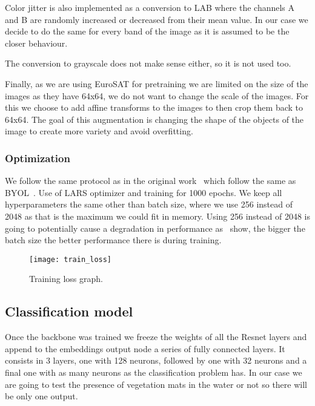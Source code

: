 \documentclass[conference]{IEEEtran}
\begin{document}
    Color jitter is also implemented as a conversion to LAB where the channels A and B are randomly increased or decreased from their mean value.
    In our case we decide to do the same for every band of the image as it is assumed to be the closer behaviour.

    The conversion to grayscale does not make sense either, so it is not used too.

    Finally, as we are using EuroSAT for pretraining we are limited on the size of the images as they have 64x64, we do not want to change the scale of the images.
    For this we choose to add affine transforms to the images to then crop them back to 64x64.
    The goal of this augmentation is changing the shape of the objects of the image to create more variety and avoid overfitting.

    \subsubsection{Optimization}
    We follow the same protocol as in the original work~\cite{barlowtwins} which follow the same as BYOL~\cite{grill2020bootstrap}.
    Use of LARS optimizer and training for 1000 epochs.
    We keep all hyperparameters the same other than batch size, where we use 256 instead of 2048 as that is the maximum we could fit in memory.
    Using 256 instead of 2048 is going to potentially cause a degradation in performance as~\citet{grill2020bootstrap, chen2020simple, barlowtwins}
    show, the bigger the batch size the better performance there is during training.

    \begin{figure}[h]
        \centering
        \texttt{[image: train\_loss]}
        \caption{Training loss graph.}
        \label{fig:training_loss_graph}
    \end{figure}

    \subsection{Classification model}
    Once the backbone was trained we freeze the weights of all the Resnet layers and append to the embeddings output node a series of fully connected layers.
    It consists in 3 layers, one with 128 neurons, followed by one with 32 neurons and a final one with as many neurons as the classification problem has.
    In our case we are going to test the presence of vegetation mats in the water or not so there will be only one output.
\end{document}
